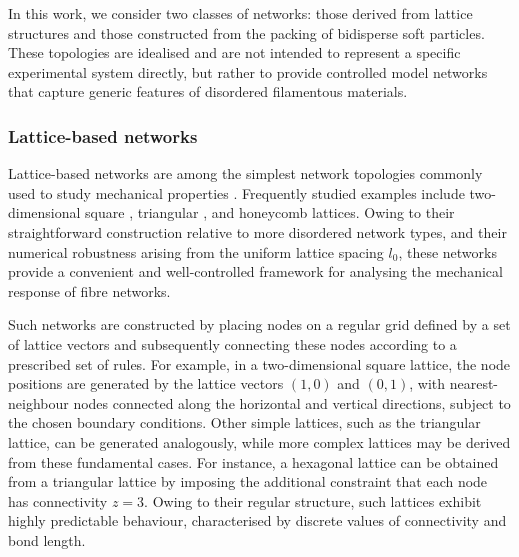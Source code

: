 In this work, we consider two classes of networks: those derived from lattice structures and those constructed from the packing of bidisperse soft particles. These topologies are idealised and are not intended to represent a specific experimental system directly, but rather to provide controlled model networks that capture generic features of disordered filamentous materials.

\subsubsection{Lattice-based networks} \label{sec:LatticeBasedNetworks}

Lattice-based networks are among the simplest network topologies commonly used to study mechanical properties \cite{jacobs_generic_1995,feng_percolation_1984,shivers_scaling_2019,sharma_strain-controlled_2016}. Frequently studied examples include two-dimensional square \cite{mao_soft_2010}, triangular \cite{broedersz_criticality_2011,feng_percolation_1984}, and honeycomb \cite{rens_nonlinear_2016} lattices. Owing to their straightforward construction relative to more disordered network types, and their numerical robustness arising from the uniform lattice spacing $l_0$, these networks provide a convenient and well-controlled framework for analysing the mechanical response of fibre networks.

Such networks are constructed by placing nodes on a regular grid defined by a set of lattice vectors and subsequently connecting these nodes according to a prescribed set of rules. For example, in a two-dimensional square lattice, the node positions are generated by the lattice vectors $(1,0)$ and $(0,1)$, with nearest-neighbour nodes connected along the horizontal and vertical directions, subject to the chosen boundary conditions. Other simple lattices, such as the triangular lattice, can be generated analogously, while more complex lattices may be derived from these fundamental cases. For instance, a hexagonal lattice can be obtained from a triangular lattice by imposing the additional constraint that each node has connectivity $z = 3$. Owing to their regular structure, such lattices exhibit highly predictable behaviour, characterised by discrete values of connectivity and bond length.

